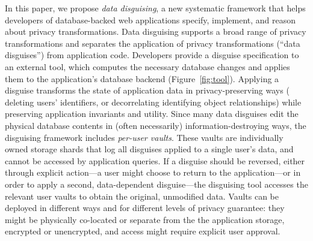 %
%
%
%
%

%
%

%
In this paper, we propose \emph{data disguising}, a new systematic framework that helps developers
of database-backed web applications specify, implement, and reason about privacy transformations.
%
Data disguising supports a broad range of privacy transformations and separates the application
of privacy transformations (``data disguises'') from application code.
%
Developers provide a disguise specification to an external tool, which computes the necessary
database changes and applies them to the application's database backend (Figure~\ref{fig:tool}).
%
Applying a disguise transforms the state of application data in privacy-preserving ways (\eg
deleting users' identifiers, or decorrelating identifying object relationships) while preserving
application invariants and utility.
%
Since many data disguises edit the physical database contents in (often necessarily)
information-destroying ways, the disguising framework includes \emph{per-user vaults}.
These vaults are individually owned storage shards that log all disguises applied to a single user's data,
and cannot be accessed by application queries.
%
If a disguise should be reversed, either through explicit action---\eg a user might choose to return
to the application---or in order to apply a second, data-dependent
disguise---the disguising tool accesses the relevant user vaults to obtain the original,
unmodified data.
%
Vaults can be deployed in different ways and for different levels of privacy guarantee: they
might be physically co-located or separate from the the application storage, encrypted or
unencrypted, and access might require explicit user approval.
%

